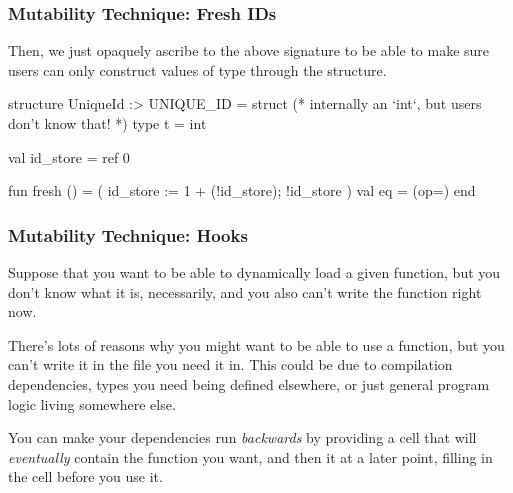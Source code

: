 \documentclass[aspectratio=169, handout]{beamer}
\begin{document}
\begin{frame}[fragile]
  \frametitle{Mutability Technique: Fresh IDs}

  Then, we just opaquely ascribe to the above signature to be able to
  make sure users can only construct values of type 
  through the structure.

  \pause
  \vspace{\fill}

  \begin{codeblock}
    structure UniqueId :> UNIQUE_ID =
      struct
        (* internally an `int`, but users don't know that! *)
        type t = int

        val id_store = ref 0

        fun fresh () =
          ( id_store := 1 + (!id_store);
            !id_store
          )
        val eq = (op=)
    end
  \end{codeblock}
\end{frame}

\begin{frame}[fragile]
  \frametitle{Mutability Technique: Hooks}

  Suppose that you want to be able to dynamically load a given function,
  but you don't know what it is, necessarily, and you also can't write the
  function right now.

  \pause
  \vspace{\fill}

  There's lots of reasons why you might want to be able to use a function,
  but you can't write it in the file you need it in. This could be due to
  compilation dependencies, types you need being defined elsewhere, or just
  general program logic living somewhere else.

  \pause
  \vspace{\fill}

  You can make your dependencies run \textit{backwards} by providing a
   cell that will \textit{eventually} contain the function you
  want, and then  it at a later point, filling in
  the cell before you use it.
\end{frame}
\end{document}
